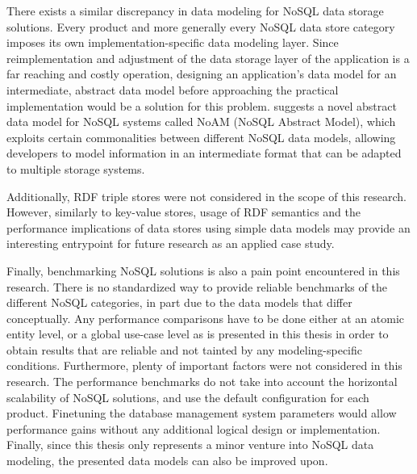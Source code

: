 There exists a similar discrepancy in data modeling for NoSQL data storage solutions.
Every product and more generally every NoSQL data store category imposes its own implementation-specific data modeling layer.
Since reimplementation and adjustment of the data storage layer of the application is a far reaching and costly operation, designing an application's data model for an intermediate, abstract data model before approaching the practical implementation would be a solution for this problem.
\citeauthor{Bugiotti2014} suggests a novel abstract data model for NoSQL systems called NoAM (NoSQL Abstract Model), which exploits certain commonalities between different NoSQL data models, allowing developers to model information in an intermediate format that can be adapted to multiple storage systems.

Additionally, RDF triple stores were not considered in the scope of this research.
However, similarly to key-value stores, usage of RDF semantics and the performance implications of data stores using simple data models may provide an interesting entrypoint for future research as an applied case study.

Finally, benchmarking NoSQL solutions is also a pain point encountered in this research.
There is no standardized way to provide reliable benchmarks of the different NoSQL categories, in part due to the data models that differ conceptually.
Any performance comparisons have to be done either at an atomic entity level, or a global use-case level as is presented in this thesis in order to obtain results that are reliable and not tainted by any modeling-specific conditions.
Furthermore, plenty of important factors were not considered in this research.
The performance benchmarks do not take into account the horizontal scalability of NoSQL solutions, and use the default configuration for each product.
Finetuning the database management system parameters would allow performance gains without any additional logical design or implementation.
Finally, since this thesis only represents a minor venture into NoSQL data modeling, the presented data models can also be improved upon.

